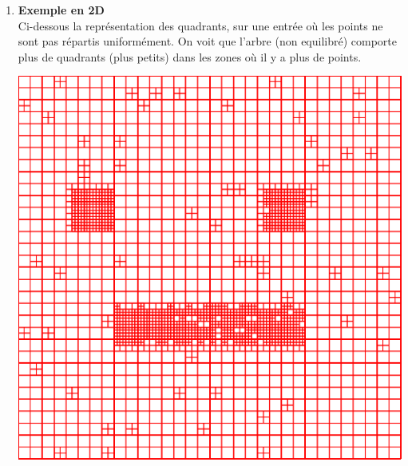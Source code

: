 \documentclass[a4paper,11pt]{article}
\begin{document}
\begin{enumerate}
        \item \textbf{Exemple en 2D}\\
        Ci-dessous la représentation des quadrants, sur une entrée où les points ne sont pas répartis uniformément. On voit que l'arbre (non equilibré) comporte plus de quadrants (plus petits) dans les zones où il y a plus de points.
        \smallbreak
        \begin{center}
                 \includegraphics[scale =0.5]{lol.png}
        \end{center}
   
    \end{enumerate}
    
    
    
    
    
    
    
    
    
    
    
\end{document}
